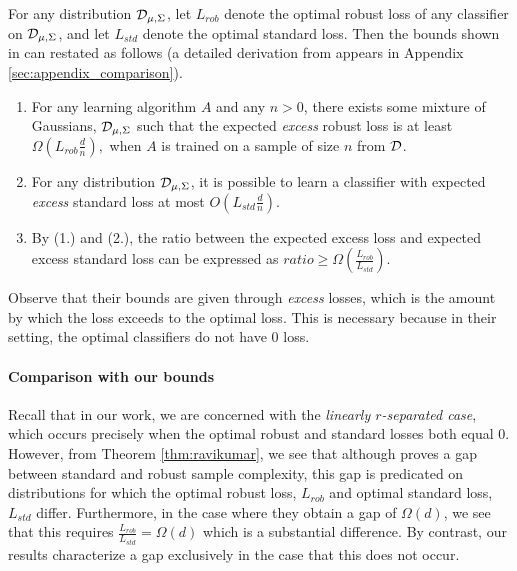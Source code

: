For any distribution ${\mathcal D}_{\mu, \Sigma}$, let $L_{rob}$ denote the optimal robust loss of any classifier on ${\mathcal D}_{\mu,\Sigma}$, and let $L_{std}$ denote the optimal standard loss. Then the bounds shown in \cite{ravikumar20} can restated as follows (a detailed derivation from \cite{ravikumar20} appears in Appendix \ref{sec:appendix_comparison}). 

\begin{thm}\label{thm:ravikumar}
\cite{ravikumar20}
\begin{enumerate}
	\item For any learning algorithm $A$ and any $n > 0$, there exists some mixture of Gaussians, ${\mathcal D}_{\mu, \Sigma}$ such that the expected \textit{excess} robust loss is at least $\Omega(L_{rob}\frac{d}{n}),$ when $A$ is trained on a sample of size $n$ from ${\mathcal D}$. 
	\item For any distribution ${\mathcal D}_{\mu, \Sigma}$, it is possible to learn a classifier with expected \textit{excess} standard loss at most $O(L_{std}\frac{d}{n})$.
	\item By (1.) and (2.), the ratio between the expected excess loss and expected excess standard loss can be expressed as $ratio \geq \Omega(\frac{L_{rob}}{L_{std}}).$
\end{enumerate}
\end{thm}

Observe that their bounds are given through \textit{excess} losses, which is the amount by which the loss exceeds to the optimal loss. This is necessary because in their setting, the optimal classifiers do not have $0$ loss. 

\paragraph{Comparison with our bounds} Recall that in our work, we are concerned with the \textit{linearly $r$-separated case}, which occurs precisely when the optimal robust and standard losses both equal $0$. However, from Theorem \ref{thm:ravikumar}, we see that although \cite{ravikumar20} proves a gap between standard and robust sample complexity, this gap is predicated on distributions for which the optimal robust loss, $L_{rob}$ and optimal standard loss, $L_{std}$ differ. Furthermore, in the case where they obtain a gap of $\Omega(d)$, we see that this requires $\frac{L_{rob}}{L_{std}} = \Omega(d)$ which is a substantial difference. By contrast, our results characterize a gap exclusively in the case that this does not occur. 

